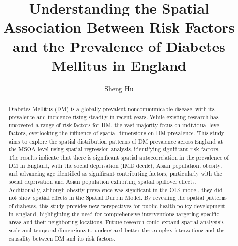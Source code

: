 
\title{Understanding the Spatial Association Between Risk Factors and the Prevalence of Diabetes Mellitus in England}
\author{Sheng Hu}
\maketitle

\begin{abstract} %
Diabetes Mellitus (DM) is a globally prevalent noncommunicable disease, with its prevalence and incidence rising steadily in recent years. While existing research has uncovered a range of risk factors for DM, the vast majority focus on individual-level factors, overlooking the influence of spatial dimensions on DM prevalence. This study aims to explore the spatial distribution patterns of DM prevalence across England at the MSOA level using spatial regression analysis, identifying significant risk factors. The results indicate that there is significant spatial autocorrelation in the prevalence of DM in England, with the social deprivation (IMD decile), Asian population, obesity, and advancing age identified as significant contributing factors, particularly with the social deprivation and Asian population exhibiting spatial spillover effects. Additionally, although obesity prevalence was significant in the OLS model, they did not show spatial effects in the Spatial Durbin Model. By revealing the spatial patterns of diabetes, this study provides new perspectives for public health policy development in England, highlighting the need for comprehensive interventions targeting specific areas and their neighboring locations. Future research could expand spatial analysis's scale and temporal dimensions to understand better the complex interactions and the causality between DM and its risk factors.
\end{abstract}


\declaration


